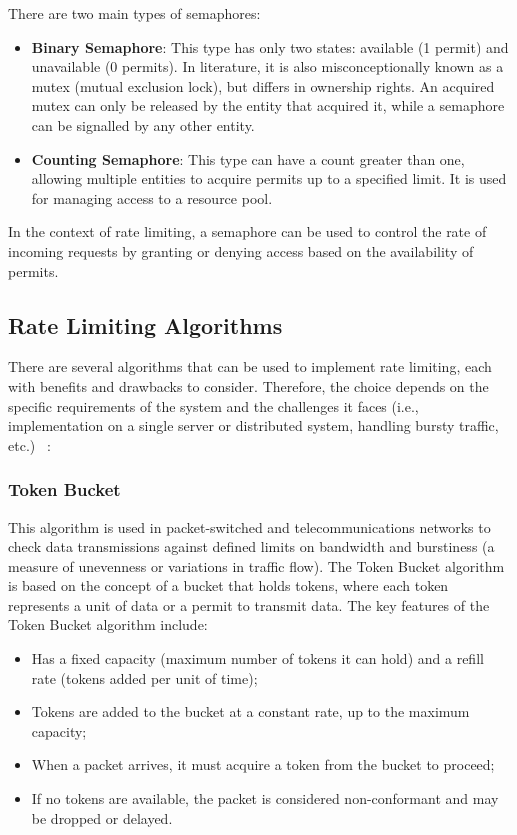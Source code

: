There are two main types of semaphores:
\begin{itemize}
    \item \textbf{Binary Semaphore}:
    This type has only two states: available (1 permit) and unavailable (0 permits).
    In literature, it is also misconceptionally known as a mutex (mutual exclusion lock),
    but differs in ownership rights.
    An acquired mutex can only be released by the entity that acquired it, while a semaphore can be signalled by any other entity.
    \item \textbf{Counting Semaphore}: This type can have a count greater than one, allowing multiple entities to acquire permits up to a specified limit.
    It is used for managing access to a resource pool.
\end{itemize}

In the context of rate limiting, a semaphore can be used to control the rate of incoming requests by granting or denying access based on the availability of permits.

\subsection{Rate Limiting Algorithms}\label{subsec:rate-limiter-algorithms}

There are several algorithms that can be used to implement rate limiting, each with benefits and drawbacks to consider.
Therefore, the choice depends on the specific requirements of the system and the challenges it faces
(i.e., implementation on a single server or distributed system, handling bursty traffic, etc.)
~\cite{medium-rate-limiting-algorithms,nordic-apis-rate-limiting-algorithms}:

\subsubsection{Token Bucket}\label{subsubsec:token-bucket-algorithm}

This algorithm is used in packet-switched and telecommunications networks
to check data transmissions against defined limits on bandwidth and burstiness
(a measure of unevenness or variations in traffic flow).
The Token Bucket algorithm is based on the concept of a bucket that holds tokens,
where each token represents a unit of data or a permit to transmit data.
The key features of the Token Bucket algorithm include:

\begin{itemize}
    \item Has a fixed capacity (maximum number of tokens it can hold) and a refill rate (tokens added per unit of time);
    \item Tokens are added to the bucket at a constant rate, up to the maximum capacity;
    \item When a packet arrives, it must acquire a token from the bucket to proceed;
    \item If no tokens are available, the packet is considered non-conformant and may be dropped or delayed.
\end{itemize}

